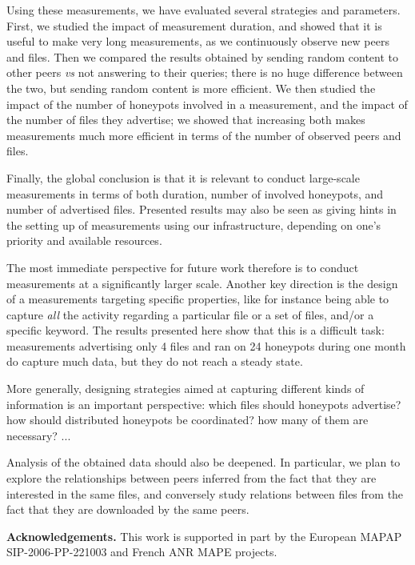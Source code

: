 \documentclass[final,
notitlepage,
narroweqnarray,
	inline,
	twoside,
]{ieee}
\begin{document}
Using these measurements, we have evaluated several strategies and parameters. First, we studied the impact of measurement duration, and showed that it is useful to make very long measurements, as we continuously observe new peers and files. Then we compared the results obtained by sending random content to other peers {\em vs} not answering to their queries; there is no huge difference between the two, but sending random content is more efficient. We then studied the impact of the number of honeypots involved in a measurement, and the impact of the number of files they advertise; we showed that increasing both makes measurements much more efficient in terms of the number of observed peers and files.

Finally, the global conclusion is that it is relevant to conduct large-scale measurements in terms of both duration, number of involved honeypots, and number of advertised files.
Presented results may also be seen as giving hints in the setting up of measurements using our infrastructure, depending on one's priority and available resources.

The most immediate perspective for future work therefore is to conduct measurements at a significantly larger scale.
Another key direction is the design of a measurements targeting specific properties, like for instance being able to capture {\em all} the activity regarding a particular file or a set of files, and/or a specific keyword. The results presented here show that this is a difficult task: measurements advertising only 4 files and ran on 24 honeypots during one month do capture much data, but they do not reach a steady state.

More generally, designing strategies aimed at capturing different kinds of information is an important perspective: which files should honeypots advertise? how should distributed honeypots be coordinated? how many of them are necessary? ...

Analysis of the obtained data should also be deepened. In particular, we plan to explore the relationships between peers inferred from the fact that they are interested in the same files, and conversely study relations between files from the fact that they are downloaded by the same peers.

\smallskip
\noindent
{\bf Acknowledgements.}
This work is supported in part by the European MAPAP SIP-2006-PP-221003 and
French ANR MAPE projects.
 


\end{document}
